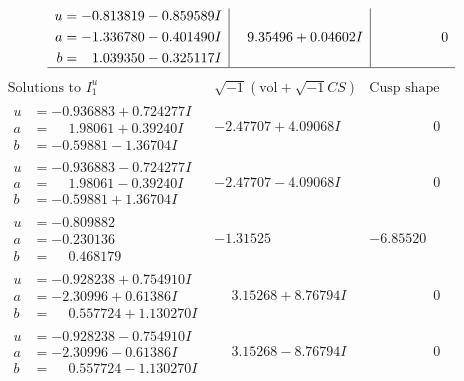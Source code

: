 \documentclass[1p]{elsarticle_modified}
\theoremstyle{definition}
\newcommand{\I}{\sqrt{-1}}
\begin{document}
$$\begin{array}{c|c|c}
\begin{aligned}
u &= -0.813819 - 0.859589 I \\
a &= -1.336780 - 0.401490 I \\
b &= \phantom{-}1.039350 - 0.325117 I\end{aligned}
 & \phantom{-}9.35496 + 0.04602 I & \phantom{-0.000000 } 0\\
 \hline 
 \end{array}$$\newpage$$\begin{array}{c|c|c}  
\text{Solutions to }I^u_{1}& \I (\text{vol} + \sqrt{-1}CS) & \text{Cusp shape}\\
 \hline 
\begin{aligned}
u &= -0.936883 + 0.724277 I \\
a &= \phantom{-}1.98061 + 0.39240 I \\
b &= -0.59881 - 1.36704 I\end{aligned}
 & -2.47707 + 4.09068 I & \phantom{-0.000000 } 0 \\ \hline\begin{aligned}
u &= -0.936883 - 0.724277 I \\
a &= \phantom{-}1.98061 - 0.39240 I \\
b &= -0.59881 + 1.36704 I\end{aligned}
 & -2.47707 - 4.09068 I & \phantom{-0.000000 } 0 \\ \hline\begin{aligned}
u &= -0.809882\phantom{ +0.000000I} \\
a &= -0.230136\phantom{ +0.000000I} \\
b &= \phantom{-}0.468179\phantom{ +0.000000I}\end{aligned}
 & -1.31525\phantom{ +0.000000I} & -6.85520\phantom{ +0.000000I} \\ \hline\begin{aligned}
u &= -0.928238 + 0.754910 I \\
a &= -2.30996 + 0.61386 I \\
b &= \phantom{-}0.557724 + 1.130270 I\end{aligned}
 & \phantom{-}3.15268 + 8.76794 I & \phantom{-0.000000 } 0 \\ \hline\begin{aligned}
u &= -0.928238 - 0.754910 I \\
a &= -2.30996 - 0.61386 I \\
b &= \phantom{-}0.557724 - 1.130270 I\end{aligned}
 & \phantom{-}3.15268 - 8.76794 I & \phantom{-0.000000 } 0 \\ \hline\begin{aligned}

\end{aligned}
\end{array}$$
\end{document}
